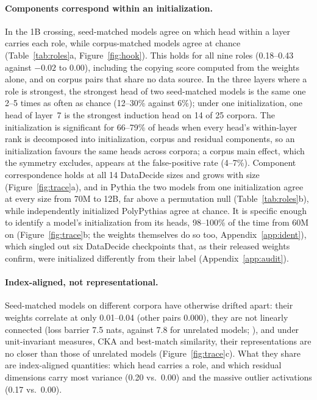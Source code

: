 \documentclass[11pt]{article}
\begin{document}
\paragraph{Components correspond within an initialization.}
In the 1B crossing, seed-matched models agree on which head within a layer carries each role, while corpus-matched models agree at chance (Table~\ref{tab:roles}a, Figure~\ref{fig:hook}).
This holds for all nine roles (0.18--0.43 against $-0.02$ to $0.00$), including the copying score computed from the weights alone, and on corpus pairs that share no data source.
In the three layers where a role is strongest, the strongest head of two seed-matched models is the same one 2--5 times as often as chance (12--30\% against 6\%); under one initialization, one head of layer~7 is the strongest induction head on 14 of 25 corpora.
The initialization is significant for 66--79\% of heads when every head's within-layer rank is decomposed into initialization, corpus and residual components, so an initialization favours the same heads across corpora; a corpus main effect, which the symmetry excludes, appears at the false-positive rate (4--7\%).
Component correspondence holds at all 14 DataDecide sizes and grows with size (Figure~\ref{fig:trace}a), and in Pythia the two models from one initialization agree at every size from 70M to 12B, far above a permutation null (Table~\ref{tab:roles}b), while independently initialized PolyPythias agree at chance.
It is specific enough to identify a model's initialization from its heads, 98--100\% of the time from 60M on (Figure~\ref{fig:trace}b; the weights themselves do so too, Appendix~\ref{app:ident}), which singled out six DataDecide checkpoints that, as their released weights confirm, were initialized differently from their label (Appendix~\ref{app:audit}).

\paragraph{Index-aligned, not representational.}
Seed-matched models on different corpora have otherwise drifted apart: their weights correlate at only 0.01--0.04 (other pairs 0.000), they are not linearly connected (loss barrier 7.5 nats, against 7.8 for unrelated models; \citealp{frankle2020linear}), and under unit-invariant measures, CKA \citep{kornblith2019similarity} and best-match similarity, their representations are no closer than those of unrelated models (Figure~\ref{fig:trace}c).
What they share are index-aligned quantities: which head carries a role, and which residual dimensions carry most variance (0.20 vs.\ 0.00) and the massive outlier activations (0.17 vs.\ 0.00).
\end{document}
